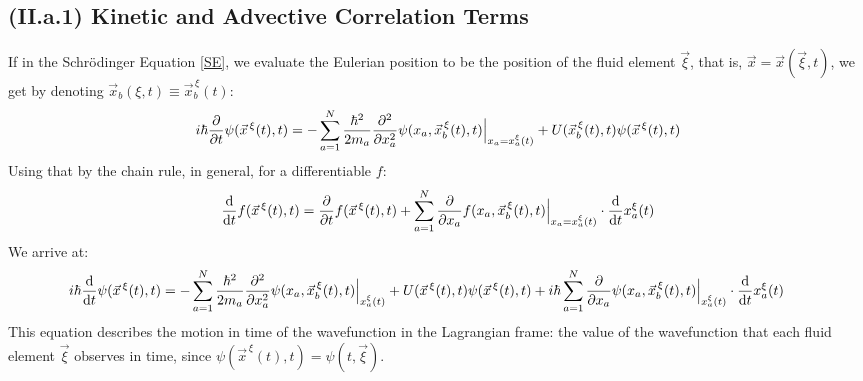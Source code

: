 \documentclass[11pt, a4paper]{article} %
\begin{document}
\subsection*{(II.a.1) Kinetic and Advective Correlation Terms\vspace{-0.2cm}}
If in the Schrödinger Equation \eqref{SE}, we evaluate the Eulerian position to be the position of the fluid element $\vec{\xi}$, that is, $\vec{x}=\vec{x}(\vec{\xi},t)$, we get by denoting $\vec{x}_b(\xi,t)\equiv \vec{x}_b^{\, \xi}(t)$:
\begin{equation}
i\hbar \pdv{}{t}\psi(\vec{x}^{\, \xi}(t),t)=-\sum_{a=1}^N \frac{\hbar^2}{2m_a}\pdv[2]{}{x_a}\psi(x_a, \vec{x}_b^{\, \xi}(t),t)\Big\rvert_{x_a=x^\xi_a(t)}+U(\vec{x}_b^{\, \xi}(t),t)\psi(\vec{x}^{\, \xi}(t),t)
\end{equation}
Using that by the chain rule, in general, for a differentiable $f$:
\begin{equation}\label{chainRuler}
\dv{}{t}f(\vec{x}^{\, \xi}(t), t)=\pdv{}{t}f(\vec{x}^{\, \xi}(t), t)+\sum_{a=1}^N \pdv{}{x_a}f(x_a,\vec{x}_b^{\, \xi}(t), t)\Big\rvert_{x_a=x^\xi_a(t)}\cdot \dv{}{t}x^\xi_a(t)
\end{equation}
We arrive at:\vspace{-0.1cm}
\begin{equation}\label{KinAdv}
\hspace{-0.6cm}i\hbar \dv{}{t}\psi(\vec{x}^{\, \xi}(t),t)=-\sum_{a=1}^N \frac{\hbar^2}{2m_a}\pdv[2]{}{x_a}\psi(x_a, \vec{x}_b^{\, \xi}(t),t)\Big\rvert_{x^\xi_a(t)}+U(\vec{x}^{\, \xi}(t),t)\psi(\vec{x}^{\, \xi}(t),t)+i\hbar \sum_{a=1}^N  \pdv{}{x_a}\psi(x_a,\vec{x}_b^{\, \xi}(t), t)\Big\rvert_{x^\xi_a(t)}\cdot \dv{}{t}x^\xi_a(t)
\end{equation}
This equation describes the motion in time of the wavefunction in the Lagrangian frame: the value of the wavefunction that each fluid element $\vec{\xi}$ observes in time, since $\psi(\vec{x}^{\, \xi}(t),t)=\psi(t, \vec{\xi})$.
\end{document}
